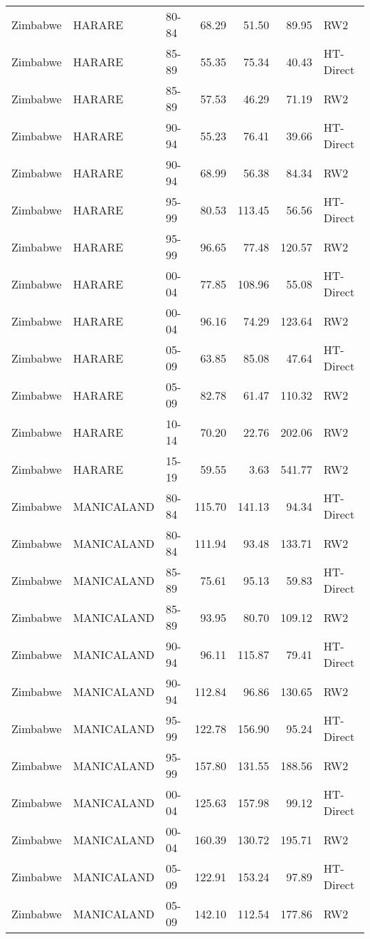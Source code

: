 \begin{longtable}{lllrrrl}
  Zimbabwe & HARARE & 80-84 & 68.29 & 51.50 & 89.95 & RW2 \\ 
  Zimbabwe & HARARE & 85-89 & 55.35 & 75.34 & 40.43 & HT-Direct \\ 
  Zimbabwe & HARARE & 85-89 & 57.53 & 46.29 & 71.19 & RW2 \\ 
  Zimbabwe & HARARE & 90-94 & 55.23 & 76.41 & 39.66 & HT-Direct \\ 
  Zimbabwe & HARARE & 90-94 & 68.99 & 56.38 & 84.34 & RW2 \\ 
  Zimbabwe & HARARE & 95-99 & 80.53 & 113.45 & 56.56 & HT-Direct \\ 
  Zimbabwe & HARARE & 95-99 & 96.65 & 77.48 & 120.57 & RW2 \\ 
  Zimbabwe & HARARE & 00-04 & 77.85 & 108.96 & 55.08 & HT-Direct \\ 
  Zimbabwe & HARARE & 00-04 & 96.16 & 74.29 & 123.64 & RW2 \\ 
  Zimbabwe & HARARE & 05-09 & 63.85 & 85.08 & 47.64 & HT-Direct \\ 
  Zimbabwe & HARARE & 05-09 & 82.78 & 61.47 & 110.32 & RW2 \\ 
  Zimbabwe & HARARE & 10-14 & 70.20 & 22.76 & 202.06 & RW2 \\ 
  Zimbabwe & HARARE & 15-19 & 59.55 & 3.63 & 541.77 & RW2 \\ 
  Zimbabwe & MANICALAND & 80-84 & 115.70 & 141.13 & 94.34 & HT-Direct \\ 
  Zimbabwe & MANICALAND & 80-84 & 111.94 & 93.48 & 133.71 & RW2 \\ 
  Zimbabwe & MANICALAND & 85-89 & 75.61 & 95.13 & 59.83 & HT-Direct \\ 
  Zimbabwe & MANICALAND & 85-89 & 93.95 & 80.70 & 109.12 & RW2 \\ 
  Zimbabwe & MANICALAND & 90-94 & 96.11 & 115.87 & 79.41 & HT-Direct \\ 
  Zimbabwe & MANICALAND & 90-94 & 112.84 & 96.86 & 130.65 & RW2 \\ 
  Zimbabwe & MANICALAND & 95-99 & 122.78 & 156.90 & 95.24 & HT-Direct \\ 
  Zimbabwe & MANICALAND & 95-99 & 157.80 & 131.55 & 188.56 & RW2 \\ 
  Zimbabwe & MANICALAND & 00-04 & 125.63 & 157.98 & 99.12 & HT-Direct \\ 
  Zimbabwe & MANICALAND & 00-04 & 160.39 & 130.72 & 195.71 & RW2 \\ 
  Zimbabwe & MANICALAND & 05-09 & 122.91 & 153.24 & 97.89 & HT-Direct \\ 
  Zimbabwe & MANICALAND & 05-09 & 142.10 & 112.54 & 177.86 & RW2 \\ 

\end{longtable}
